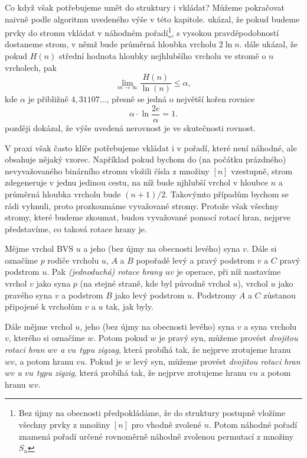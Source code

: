 Co když však potřebujeme umět do struktury i vkládat? Můžeme pokračovat naivně
podle algoritmu uvedeného výše v této kapitole. \citet{searchingsorting}
ukázal, že pokud budeme prvky do stromu vkládat v náhodném pořadí\footnote{Bez
újmy na obecnosti předpokládáme, že do struktury postupně vložíme všechny prvky
z množiny $[n]$ pro vhodně zvolené $n$. Potom náhodné pořadí znamená pořadí
určené rovnoměrně náhodně zvolenou permutací z množiny $S_n$}, s vysokou
pravděpodobností dostaneme strom, v němž bude průměrná hloubka vrcholu $2 \ln n$.
\citet{Robson} dále ukázal, že pokud $H(n)$ střední hodnota hloubky nejhlubšího 
vrcholu ve stromě o $n$ vrcholech, pak $$\lim_{m\rightarrow
\infty}\frac{H(n)}{\ln(n)}\leq\alpha,$$ kde $\alpha$ je přibližně
$4{,}31107\dots$, přesně se jedná o největší kořen rovnice $$\alpha\cdot \ln
\frac{2e}{\alpha} = 1.$$ \citet{devroye} později dokázal, že výše uvedená
nerovnost je ve skutečnosti rovnost.

V praxi však často klíče potřebujeme vkládat i v pořadí, které není náhodné,
ale obsahuje nějaký vzorec. Například pokud bychom do (na počátku prázdného)
nevyvažovaného binárního stromu vložili čísla z množiny $[n]$ vzestupně, strom
zdegeneruje v jednu jedinou cestu, na níž bude njhlubší vrchol v hloubce $n$ a
průměrná hloubka vrcholu bude $(n+1)/2$. Takovýmto případům bychom se rádi
vyhnuli, proto prozkoumáme vyvažované stromy. Protože však všechny stromy,
které budeme zkoumat, budou vyvažované pomocí rotací hran, nejprve představíme,
co taková rotace hrany je.

\begin{definice}
Mějme vrchol BVS $u$ a jeho (bez újmy na obecnosti levého) syna $v$. Dále si
označíme $p$ rodiče vrcholu $u$, $A$ a $B$ popořadě levý a pravý podstrom $v$ a
$C$ pravý podstrom $u$. Pak \emph{(jednoduchá) rotace hrany $uv$} je operace,
při níž nastavíme vrchol $v$ jako syna $p$ (na stejné straně, kde byl původně
vrchol $u$), vrchol $u$ jako pravého syna $v$ a podstrom $B$ jako levý podstrom
$u$. Podstromy $A$ a $C$ zůstanou připojené k vrcholům $v$ a $u$ tak, jak byly.

Dále mějme vrchol $u$, jeho (bez újmy na obecnosti levého) syna $v$ a syna
vrcholu $v$, kterého si označíme $w$. Potom pokud $w$ je pravý syn, můžeme
provést \emph{dvojitou rotaci hran $wv$ a $vu$ typu zigzag}, která probíhá tak,
že nejprve zrotujeme hranu $wv$, a potom hranu $vu$. Pokud je $w$ levý syn,
můžeme provést \emph{dvojitou rotaci hran $wv$ a $vu$ typu zigzig}, která
probíhá tak, že nejprve zrotujeme hranu $vu$ a potom hranu $wv$.
\end{definice}

